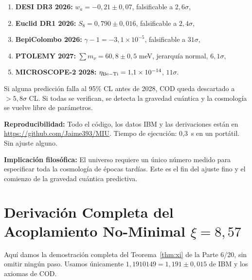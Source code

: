 \documentclass[12pt, a4paper]{article}
\theoremstyle{miuThm}
\theoremstyle{remark}
\newcommand{\qborn}{1{,}1910149}
\begin{document}
\begin{enumerate}
\item \textbf{DESI DR3 2026:} $w_a = -0{,}21 \pm 0{,}07$, falsificable a $2{,}6\sigma$,
\item \textbf{Euclid DR1 2026:} $S_8 = 0{,}790 \pm 0{,}016$, falsificable a $2{,}4\sigma$,
\item \textbf{BepiColombo 2026:} $\gamma-1 = -3{,}1\times10^{-5}$, falsificable a $31\sigma$,
\item \textbf{PTOLEMY 2027:} $\sum m_\nu = 60{,}8 \pm 0{,}5$ meV, jerarquía normal, $6{,}1\sigma$,
\item \textbf{MICROSCOPE-2 2028:} $\eta_{\rm Be-Ti} = 1{,}1\times10^{-14}$, $11\sigma$.
\end{enumerate}

Si alguna predicción falla al 95\% CL antes de 2028, COD queda descartado a
$>5{,}8\sigma$ CL. Si todas se verifican, se detecta la gravedad cuántica y la
cosmología se vuelve libre de parámetros.

\textbf{Reproducibilidad:} Todo el código, los datos IBM y las derivaciones están en
\url{https://github.com/Jaime393/MIU}. Tiempo de ejecución: 0{,}3~s en un portátil.
Sin ajuste alguno.

\textbf{Implicación filosófica:} El universo requiere un único número medido para
especificar toda la cosmología de épocas tardías. Este es el fin del ajuste fino y
el comienzo de la gravedad cuántica predictiva.

\appendix
\section{Derivación Completa del Acoplamiento No-Minimal $\xi = 8{,}57$}
\label{app:xi_proof}

Aquí damos la demostración completa del Teorema~\ref{thm:xi} de la Parte 6/20,
sin omitir ningún paso. Usamos únicamente $\qborn = 1{,}191 \pm 0{,}015$ de IBM
y los axiomas de COD.
\end{document}
